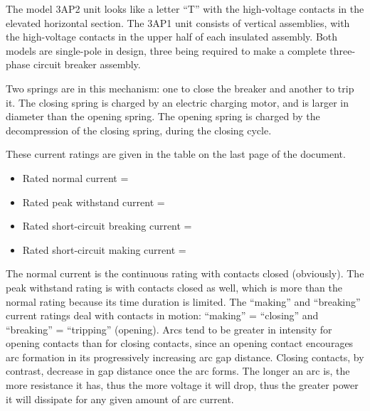 \vskip 10pt

The model 3AP2 unit looks like a letter ``T'' with the high-voltage contacts in the elevated horizontal section.  The 3AP1 unit consists of vertical assemblies, with the high-voltage contacts in the upper half of each insulated assembly.  Both models are single-pole in design, three being required to make a complete three-phase circuit breaker assembly.

\vskip 10pt

Two springs are in this mechanism: one to close the breaker and another to trip it.  The closing spring is charged by an electric charging motor, and is larger in diameter than the opening spring.  The opening spring is charged by the decompression of the closing spring, during the closing cycle.  

\vskip 10pt

These current ratings are given in the table on the last page of the document.

\begin{itemize}
\item{} Rated normal current = 
\vskip 5pt
\item{} Rated peak withstand current = 
\vskip 5pt
\item{} Rated short-circuit breaking current = 
\vskip 5pt
\item{} Rated short-circuit making current = 
\end{itemize}

The normal current is the continuous rating with contacts closed (obviously).  The peak withstand rating is with contacts closed as well, which is more than the normal rating because its time duration is limited.  The ``making'' and ``breaking'' current ratings deal with contacts in motion: ``making'' = ``closing'' and ``breaking'' = ``tripping'' (opening).  Arcs tend to be greater in intensity for opening contacts than for closing contacts, since an opening contact encourages arc formation in its progressively increasing arc gap distance.  Closing contacts, by contrast, decrease in gap distance once the arc forms.  The longer an arc is, the more resistance it has, thus the more voltage it will drop, thus the greater power it will dissipate for any given amount of arc current.




